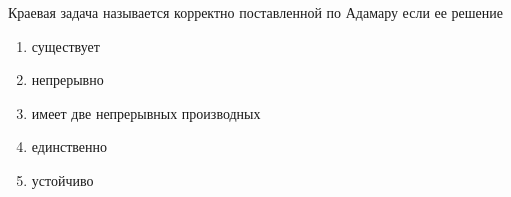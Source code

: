 Краевая задача называется корректно поставленной по Адамару если ее решение

\begin{enumerate}[label=\arabic*)]
    \item существует
    \item непрерывно
    \item имеет две непрерывных производных
    \item единственно
    \item устойчиво
\end{enumerate}

